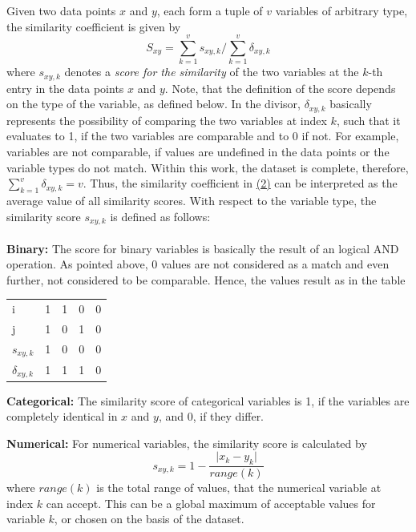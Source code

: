 	Given two data points $x$ and $y$, each form a tuple of $v$ variables of arbitrary type, the similarity coefficient is given by
	\begin{equation}\label{eq1}
	S_{xy} = \sum_{k=1}^{v} s_{xy,k} / \sum_{k=1}^{v} \delta_{xy,k} 
	\end{equation} 
	where $s_{xy,k}$ denotes a \textit{score for the similarity} of the two variables at the $k$-th entry in the data points $x$ and $y$. Note, that the definition of the score depends on the
	type of the variable, as defined below. In the divisor, $\delta_{xy,k}$ basically represents the possibility of comparing the two variables at index $k$, such that it evaluates to 1, if the two variables are comparable and to 0 if not. %
	For example, variables are not comparable, if values are undefined in the data points or the variable types do not match. Within this work, the dataset is complete, therefore, $\sum_{k=1}^{v} \delta_{xy,k}=v$. Thus, the similarity coefficient in \hyperref[eq1]{(2)} can be interpreted as the average value of all similarity scores. 
	With respect to the variable type, the similarity score $s_{xy,k}$ is defined as follows:\\
	\\ \textbf{Binary:} The score for binary variables is basically the result of an logical AND operation. As pointed above, 0 values are not considered as a match and even further, not considered to be comparable. Hence, the values result as in the table
		\begin{center}
			\begin{tabular}{l | c c c r}
				i & 1 & 1 & 0 & 0 \\
				j & 1 & 0 & 1 & 0 \\
				\hline
				$s_{xy,k}$ & 1 & 0 & 0 & 0 \\
				$\delta_{xy,k}$ & 1 & 1 & 1 & 0
			\end{tabular}
		\end{center}	
	\textbf{Categorical:} The similarity score of categorical variables is 1, if the variables are completely identical in $x$ and $y$, and 0, if they differ.
	
	\textbf{Numerical:} For numerical variables, the similarity score is calculated by
		\begin{equation*}
		s_{xy,k} = 1 - \frac{\vert x_k - y_k \vert}{range(k)}
		\end{equation*}
		where $range(k)$ is the total range of values, that the numerical variable at index $k$ can accept. This can be a global maximum of acceptable values for variable $k$, or chosen on the basis of the dataset.
		
